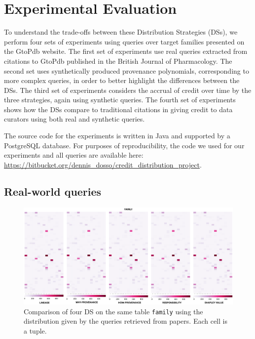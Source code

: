\documentclass[preprint,12pt,sort&compress]{elsarticle}
\begin{document}
\section{Experimental Evaluation}
\label{sec:experiments}
To understand the trade-offs between these Distribution Strategies (DSs), we perform four sets of experiments using queries over target families presented on the GtoPdb website. The first set of experiments use real queries extracted from citations to GtoPdb published in the British Journal of Pharmacology.  
The second set uses synthetically produced provenance polynomials, corresponding to more complex queries, in order to better highlight the differences between the DSs.
The third set of experiments considers the accrual of credit over time by the three strategies, again using synthetic queries.
The fourth set of experiments shows how the DSs compare to traditional citations in giving credit to data curators using both real and synthetic queries.

The source code for the experiments is written in Java and supported by a PostgreSQL database. For purposes of reproducibility, the code we used for our experiments and all queries are available here: \url{https://bitbucket.org/dennis_dosso/credit_distribution_project}.

\subsection{Real-world queries}
\label{sec:real_world_queries}

\begin{figure}[t]
\centering
  \includegraphics[width=\textwidth]{paper_based}
  \caption{Comparison of four DS on the same table \texttt{family} using the distribution given by the queries retrieved from papers. Each cell is a tuple.}
  \label{figure:comparison_on_papers}
\end{figure}
\end{document}

